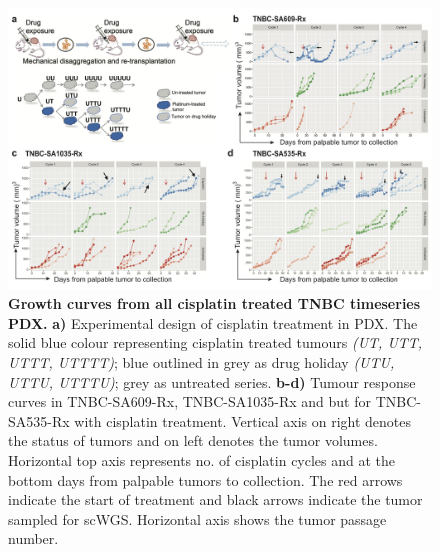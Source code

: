 \begin{figure}
\centering
\includegraphics[width=\textwidth]{Figures/chap4/SA609allcyclescisplatin.png}
	
\caption[Representative growth curves from TNBC-SA609 treated with cisplatin]
	{\small
	\textbf{Growth curves from all cisplatin treated TNBC timeseries PDX.}
	   \textbf{a)} Experimental design of cisplatin treatment in PDX. The solid blue colour representing cisplatin treated tumours \textit{(UT, UTT, UTTT, UTTTT)}; blue outlined in grey as drug holiday \textit{(UTU, UTTU, UTTTU)}; grey as untreated series. \textbf{b-d)} Tumour response curves in TNBC-SA609-Rx, TNBC-SA1035-Rx and but for TNBC-SA535-Rx with cisplatin treatment. Vertical axis on right denotes the status of tumors and on left denotes the tumor volumes. Horizontal top axis represents no. of cisplatin cycles and at the bottom days from palpable tumors to collection. The red arrows indicate the start of treatment and black arrows indicate the tumor sampled for scWGS. Horizontal axis shows the tumor passage number.}
	
	\label{fig:SA609allcyclescisplatin}
\end{figure}

